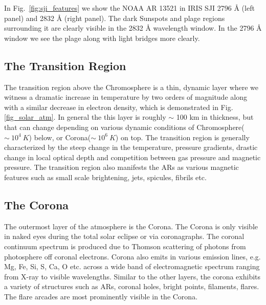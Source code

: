 In Fig.~\ref{fig:sji_features} we show the NOAA AR 13521 in IRIS SJI 2796 {\AA} (left panel) and 2832 {\AA} (right panel). The dark Sunspots and plage regions surrounding it are clearly visible in the 2832 {\AA} wavelength window. In the 2796 {\AA} window we see the plage along with light bridges more clearly. 

\subsection{The Transition Region}\label{transition-region}

The transition region above the Chromosphere is a thin, dynamic layer where we witness a dramatic increase in temperature by two orders of magnitude along with a similar decrease in electron density, which is demonstrated in Fig. \ref{fig_solar_atm}. In general the this layer is roughly $\sim$ 100 km in thickness, but that can change depending on various dynamic conditions of Chromosphere($\sim~10^{4}~K$) below, or Corona($\sim~10^{6}~K$) on top. The transition region is generally characterized by the steep change in the temperature, pressure gradients, drastic change in local optical depth and competition between gas pressure and magnetic pressure. The transition region also manifests the ARs as various magnetic features such as small scale brightening, jets, spicules, fibrils etc. 

\subsection{The Corona}\label{corona}

The outermost layer of the atmosphere is the Corona. The Corona is only visible in naked eyes during the total solar eclipse or via coronagraphs. The coronal continuum spectrum is produced due to Thomson scattering of photons from photosphere off coronal electrons. Corona also emits in various emission lines, e.g. Mg, Fe, Si, S, Ca, O etc. across a wide band of electromagnetic spectrum ranging from X-ray to visible wavelengths. Similar to the other layers, the corona exhibits a variety of structures such as ARs, coronal holes, bright points, filaments, flares. The flare arcades are most prominently visible in the Corona.  

